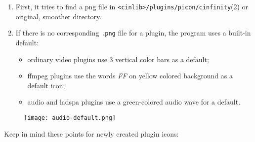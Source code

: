 \begin{enumerate}
    \item First, it tries to find a png file in \texttt{<cinlib>/plugins/picon/cinfinity}(2) or original, smoother directory.
    \item If there is no corresponding \texttt{.png} file for a plugin, the program uses a built-in default:
    \begin{itemize}
        \item ordinary video plugins use 3 vertical color bars as a default;
        \item ffmpeg plugins use the words \textit{FF} on yellow colored background as a default icon;
        \item audio and ladspa plugins use a green-colored audio wave for a default.
    \end{itemize}
\end{enumerate}
\begin{figure}[htpb]
    \centering
    \texttt{[image: audio-default.png]}
\end{figure}

Keep in mind these points for newly created plugin icons:

